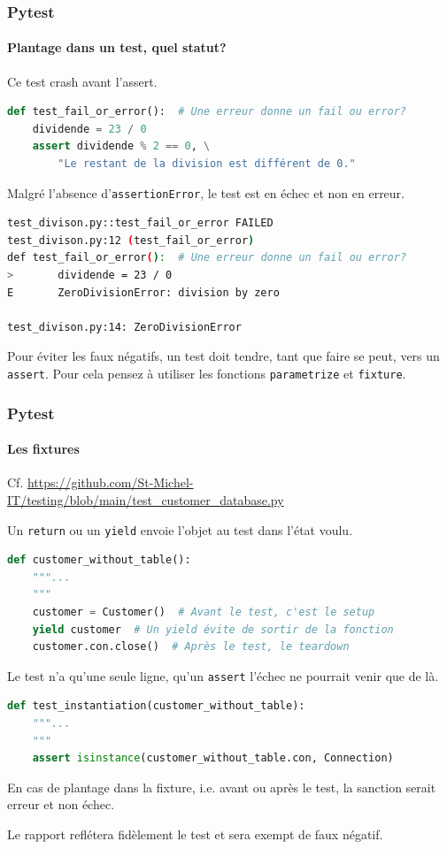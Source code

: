 \documentclass{beamer}
\begin{document}
    \begin{frame}[fragile]
        \frametitle{Pytest}
        \framesubtitle{Plantage dans un test, quel statut?}
        \transdissolve
        Ce test crash avant l'assert.
        \begin{lstlisting}[language=Python]
def test_fail_or_error():  # Une erreur donne un fail ou error?
    dividende = 23 / 0
    assert dividende % 2 == 0, \
        "Le restant de la division est différent de 0."
        \end{lstlisting}
        Malgré l'absence d'\lstinline{assertionError}, le test est en échec et non en erreur.
        \begin{lstlisting}[language=sh]
test_divison.py::test_fail_or_error FAILED                               [100%]
test_divison.py:12 (test_fail_or_error)
def test_fail_or_error():  # Une erreur donne un fail ou error?
>       dividende = 23 / 0
E       ZeroDivisionError: division by zero

test_divison.py:14: ZeroDivisionError
        \end{lstlisting}

        \begin{dangercolorbox}
            Pour éviter les faux négatifs, un test doit tendre, tant que faire se peut, vers un \lstinline{assert}. Pour cela pensez à utiliser les fonctions \lstinline{parametrize} et \lstinline{fixture}.
        \end{dangercolorbox}
    \end{frame}

    \begin{frame}[fragile]
        \frametitle{Pytest}
        \framesubtitle{Les fixtures}
        \transdissolve
        Cf. \url{https://github.com/St-Michel-IT/testing/blob/main/test_customer_database.py}

        Un \lstinline{return} ou un \lstinline{yield} envoie l'objet au test dans l'état voulu.
        \begin{lstlisting}[language=Python]
def customer_without_table():
    """...
    """
    customer = Customer()  # Avant le test, c'est le setup
    yield customer  # Un yield évite de sortir de la fonction
    customer.con.close()  # Après le test, le teardown
        \end{lstlisting}
        Le test n'a qu'une seule ligne, qu'un \lstinline{assert} l'échec ne
        pourrait venir que de là.
        \begin{lstlisting}[language=Python]
def test_instantiation(customer_without_table):
    """...
    """
    assert isinstance(customer_without_table.con, Connection)
        \end{lstlisting}
        En cas de plantage dans la fixture, i.e. avant ou après le test, la sanction
        serait erreur et non échec.

        Le rapport reflétera fidèlement le test et sera exempt de faux négatif.
    \end{frame}
\end{document}
